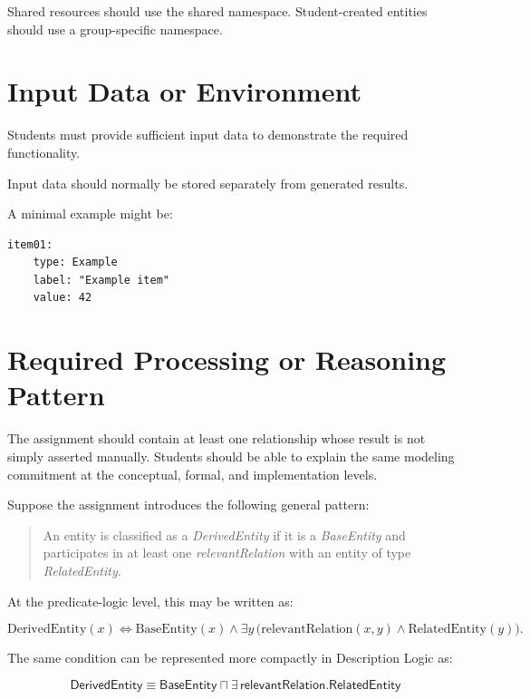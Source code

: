 \documentclass[11pt]{article}
\begin{document}
Shared resources should use the shared namespace. Student-created entities
should use a group-specific namespace.

\section{Input Data or Environment}

Students must provide sufficient input data to demonstrate the required
functionality.

Input data should normally be stored separately from generated results.

A minimal example might be:

\begin{lstlisting}[style=codesnippet]
item01:
    type: Example
    label: "Example item"
    value: 42
\end{lstlisting}

\section{Required Processing or Reasoning Pattern}

The assignment should contain at least one relationship whose result is not
simply asserted manually. Students should be able to explain the same modeling
commitment at the conceptual, formal, and implementation levels.

Suppose the assignment introduces the following general pattern:

\begin{quote}
An entity is classified as a \emph{DerivedEntity} if it is a
\emph{BaseEntity} and participates in at least one
\emph{relevantRelation} with an entity of type \emph{RelatedEntity}.
\end{quote}

At the predicate-logic level, this may be written as:

\[
\mathrm{DerivedEntity}(x)
\iff
\mathrm{BaseEntity}(x)
\land
\exists y\,
\bigl(
    \mathrm{relevantRelation}(x,y)
    \land
    \mathrm{RelatedEntity}(y)
\bigr).
\]

The same condition can be represented more compactly in Description Logic as:

\[
\boxed{
\mathsf{DerivedEntity}
\equiv
\mathsf{BaseEntity}
\sqcap
\exists\,\mathsf{relevantRelation}.\mathsf{RelatedEntity}
}
\]
\end{document}
